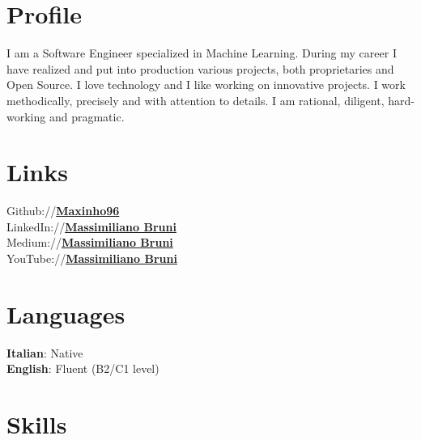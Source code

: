 \documentclass[]{deedy-resume-openfont}
\begin{document}
\begin{minipage}[t]{0.33\textwidth} 


\section{Profile}
I am a Software Engineer specialized in Machine Learning. During my career I have realized and put into production various projects, both proprietaries and Open Source. I love technology and I like working on innovative projects. I work methodically, precisely and with attention to details. I am rational, diligent, hard-working and pragmatic.


\section{Links} 
Github://\href{https://github.com/Maxinho96}{\bf Maxinho96} \\
LinkedIn://\href{https://www.linkedin.com/in/massimiliano-bruni-352926120}{\bf Massimiliano Bruni} \\
Medium://\href{https://medium.com/@massimilianobruni-92986}{\bf Massimiliano Bruni} \\
YouTube://\href{https://www.youtube.com/channel/UCqskrALDsaUvYC8ztJyqCug}{\bf Massimiliano Bruni}
\sectionsep


\section{Languages}
\textbf{Italian}: Native \\
\textbf{English}: Fluent (B2/C1 level)
\sectionsep


\section{Skills}


\end{minipage}
\end{document}
